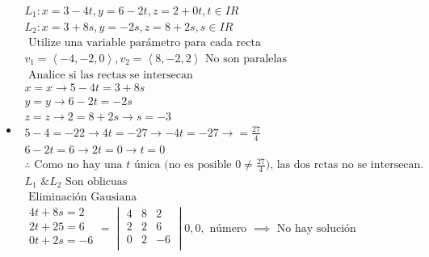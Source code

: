 \begin{itemize}
     \item 
        \begin{center}
            \begin{align*}
                L_1:  x = 3-4t, y = 6-2t, z= 2+ 0t, t \in IR\\  
                 L_2:  x = 3+ 8s, y = -2s, z = 8+2s, s \in IR \\ 
                 \text{  Utilize una variable parámetro para cada recta  } \\ 
                 v_1 = \left\langle -4,-2,0 \right\rangle , v_2 = \left\langle 8,-2,2 \right\rangle \text{  No son paralelas  } \\ 
                 \text{  Analice si las rectas se intersecan  } \\ 
                 x=x \rightarrow 5-4t=3+8s \\ 
                 y=y \rightarrow 6-2t=-2s \\ 
                 z=z \rightarrow 2 = 8 + 2s \rightarrow s = -3 \\ 
                 5-4=-22 \rightarrow 4t=-27 \rightarrow -4t=-27 \rightarrow = \frac{27}{4} \\ 
                 6-2t = 6 \rightarrow 2t = 0 \rightarrow t=0 \\ 
                 \therefore \text{  Como no hay una $t$ única (no es posible $0 \neq \frac{27}{4} $), las dos rctas no se intersecan.  } \\ 
                 L_1 \text{  \&  }L_2 \text{  Son oblicuas  } \\ 
                 \text{  Eliminación Gausiana  } \\ 
                 \begin{matrix}
                     4t+8s = 2 \\ 
                     2t+25 = 6 \\ 
                     0t + 2s = -6 \\ 
                 \end{matrix} = 
                 \begin{vmatrix}
                     4 & 8 & 2 \\ 
                     2 & 2 & 6 \\ 
                     0 & 2 & -6 \\ 
                 \end{vmatrix} 
                 0,0,\text{  número  } \implies \text{  No hay solución  } \\ 
             \end{align*}
        \end{center}
\end{itemize}


